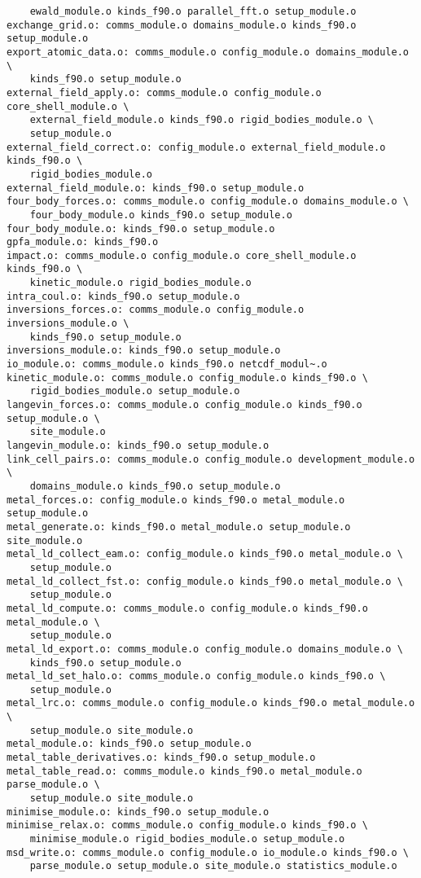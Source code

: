 \begin{verbatim}
	ewald_module.o kinds_f90.o parallel_fft.o setup_module.o
exchange_grid.o: comms_module.o domains_module.o kinds_f90.o setup_module.o
export_atomic_data.o: comms_module.o config_module.o domains_module.o \
	kinds_f90.o setup_module.o
external_field_apply.o: comms_module.o config_module.o core_shell_module.o \
	external_field_module.o kinds_f90.o rigid_bodies_module.o \
	setup_module.o
external_field_correct.o: config_module.o external_field_module.o kinds_f90.o \
	rigid_bodies_module.o
external_field_module.o: kinds_f90.o setup_module.o
four_body_forces.o: comms_module.o config_module.o domains_module.o \
	four_body_module.o kinds_f90.o setup_module.o
four_body_module.o: kinds_f90.o setup_module.o
gpfa_module.o: kinds_f90.o
impact.o: comms_module.o config_module.o core_shell_module.o kinds_f90.o \
	kinetic_module.o rigid_bodies_module.o
intra_coul.o: kinds_f90.o setup_module.o
inversions_forces.o: comms_module.o config_module.o inversions_module.o \
	kinds_f90.o setup_module.o
inversions_module.o: kinds_f90.o setup_module.o
io_module.o: comms_module.o kinds_f90.o netcdf_modul~.o
kinetic_module.o: comms_module.o config_module.o kinds_f90.o \
	rigid_bodies_module.o setup_module.o
langevin_forces.o: comms_module.o config_module.o kinds_f90.o setup_module.o \
	site_module.o
langevin_module.o: kinds_f90.o setup_module.o
link_cell_pairs.o: comms_module.o config_module.o development_module.o \
	domains_module.o kinds_f90.o setup_module.o
metal_forces.o: config_module.o kinds_f90.o metal_module.o setup_module.o
metal_generate.o: kinds_f90.o metal_module.o setup_module.o site_module.o
metal_ld_collect_eam.o: config_module.o kinds_f90.o metal_module.o \
	setup_module.o
metal_ld_collect_fst.o: config_module.o kinds_f90.o metal_module.o \
	setup_module.o
metal_ld_compute.o: comms_module.o config_module.o kinds_f90.o metal_module.o \
	setup_module.o
metal_ld_export.o: comms_module.o config_module.o domains_module.o \
	kinds_f90.o setup_module.o
metal_ld_set_halo.o: comms_module.o config_module.o kinds_f90.o \
	setup_module.o
metal_lrc.o: comms_module.o config_module.o kinds_f90.o metal_module.o \
	setup_module.o site_module.o
metal_module.o: kinds_f90.o setup_module.o
metal_table_derivatives.o: kinds_f90.o setup_module.o
metal_table_read.o: comms_module.o kinds_f90.o metal_module.o parse_module.o \
	setup_module.o site_module.o
minimise_module.o: kinds_f90.o setup_module.o
minimise_relax.o: comms_module.o config_module.o kinds_f90.o \
	minimise_module.o rigid_bodies_module.o setup_module.o
msd_write.o: comms_module.o config_module.o io_module.o kinds_f90.o \
	parse_module.o setup_module.o site_module.o statistics_module.o

\end{verbatim}
